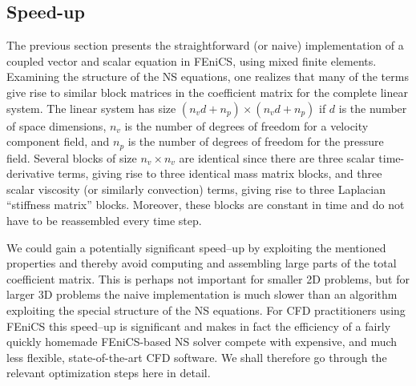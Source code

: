 \subsection{Speed-up}
\label{sec:mortensen:speed-up}

The previous section presents the straightforward (or naive)
implementation of a coupled vector and scalar equation in FEniCS,
using mixed finite elements.  Examining the structure of the NS
equations, one realizes that many of the terms give rise to similar
block matrices in the coefficient matrix for the complete linear
system. The linear system has size $(n_vd+n_p)\times (n_vd+n_p)$ if
$d$ is the number of space dimensions, $n_v$ is the number of degrees
of freedom for a velocity component field, and $n_p$ is the number of
degrees of freedom for the pressure field.  Several blocks of size
$n_v\times n_v$ are identical since there are three scalar
time-derivative terms, giving rise to three identical mass matrix
blocks, and three scalar viscosity (or similarly convection) terms,
giving rise to three Laplacian ``stiffness matrix'' blocks.  Moreover,
these blocks are constant in time and do not have to be reassembled
every time step.

We could gain a potentially significant speed--up by exploiting the
mentioned properties and thereby avoid computing and assembling large
parts of the total coefficient matrix. This is perhaps not important
for smaller 2D problems, but for larger 3D problems the naive
implementation is much slower than an algorithm exploiting the special
structure of the NS equations.  For CFD practitioners using FEniCS
this speed--up is significant and makes in fact the efficiency of a
fairly quickly homemade FEniCS-based NS solver compete with expensive,
and much less flexible, state-of-the-art CFD software.  We shall
therefore go through the relevant optimization steps here in detail.

